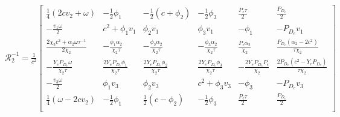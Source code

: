 \begin{align*}
  \mathcal{R}_{2}^{-1} = \frac{1}{c^2}
  \left[
  \begin{array}{cccccc}
   \frac{1}{4} (2 c  v_{2}+\omega ) & -\frac{1}{2} \phi_{1} & -\frac{1}{2} (c+\phi_{2})
    & -\frac{1}{2} \phi_{3}  & \frac{P_{\epsilon} \tau }{2} & \frac{P_{D_{e}}}{2}
     \\
   -\frac{v_{1} \omega }{2} & c^2 + \phi_{1} v_{1}  & \phi_{2} v_{1}  &
     \phi_{3} v_{1}  & -\phi_{1}  & -P_{D_{e}} v_{1}
     \\
   \frac{2 \chi_{2}  c^2+\alpha_{2}  \omega \tau^{-1} }{2 \chi_{2} } & -\frac{\phi_{1} \alpha_{2}  }{\chi_{2} \tau } &
     -\frac{\phi_{2} \alpha_{2}  }{\chi_{2} \tau } & -\frac{\phi_{3} \alpha_{2} }{\chi_{2} \tau } &
     \frac{P_{\epsilon} \alpha_{2} }{\chi_{2} } & \frac{P_{D_{e}} \left(\alpha_{2} -2 c^2\right)}{\tau \chi_{2} }
      \\
   -\frac{Y_{e} P_{D_{e}} \omega }{\chi_{2} \tau } & \frac{2 Y_{e} P_{D_{e}} \phi_{1} }{\chi_{2} \tau } & \frac{2 Y_{e} P_{D_{e}}
     \phi_{2} }{\chi_{2} \tau} & \frac{2 Y_{e} P_{D_{e}} \phi_{3} }{\chi_{2} \tau} & -\frac{2 Y_{e}
     P_{D_{e}} P_{\epsilon} }{\chi_{2} } & \frac{2 P_{D_{e}} \left(c^2-Y_{e} P_{D_{e}} \right)}{\tau \chi_{2} }
      \\
   -\frac{v_{3} \omega }{2} & \phi_{1} v_{3}  & \phi_{2} v_{3}   &
     c^2+\phi_{3} v_{3}  & -\phi_{3}  & -P_{D_{e}} v_{3}
      \\
   \frac{1}{4} (\omega -2 c  v_{2}) & -\frac{1}{2} \phi_{1}  & \frac{1}{2} (c-\phi_{2})
       & -\frac{1}{2} \phi_{3}  & \frac{P_{\epsilon} \tau }{2} & \frac{P_{D_{e}}}{2}
     \\
  \end{array}
  \right]
\end{align*}

